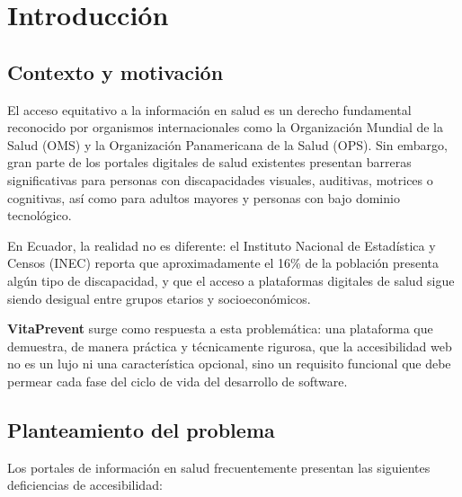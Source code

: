\documentclass[12pt, a4paper]{report}
\begin{document}
\tableofcontents
\listoffigures
\listoftables

\cleardoublepage
{}

\chapter{Introducción}

\section{Contexto y motivación}

El acceso equitativo a la información en salud es un derecho fundamental reconocido por organismos internacionales como la Organización Mundial de la Salud (OMS) y la Organización Panamericana de la Salud (OPS). Sin embargo, gran parte de los portales digitales de salud existentes presentan barreras significativas para personas con discapacidades visuales, auditivas, motrices o cognitivas, así como para adultos mayores y personas con bajo dominio tecnológico.

En Ecuador, la realidad no es diferente: el Instituto Nacional de Estadística y Censos (INEC) reporta que aproximadamente el 16\% de la población presenta algún tipo de discapacidad, y que el acceso a plataformas digitales de salud sigue siendo desigual entre grupos etarios y socioeconómicos.

\textbf{VitaPrevent} surge como respuesta a esta problemática: una plataforma que demuestra, de manera práctica y técnicamente rigurosa, que la accesibilidad web no es un lujo ni una característica opcional, sino un requisito funcional que debe permear cada fase del ciclo de vida del desarrollo de software.

\section{Planteamiento del problema}

Los portales de información en salud frecuentemente presentan las siguientes deficiencias de accesibilidad:
\end{document}

